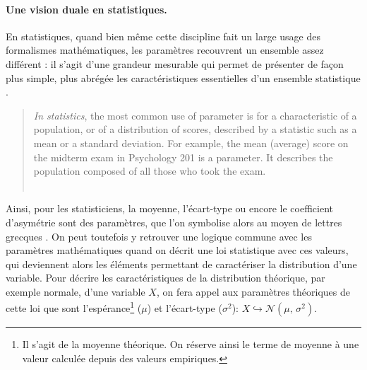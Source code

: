 \paragraph{Une vision duale en statistiques.}

En statistiques, quand bien même cette discipline fait un large usage des formalismes mathématiques, les paramètres recouvrent un ensemble assez différent :
	il s'agit d'une \og grandeur mesurable qui permet de présenter de façon plus simple, plus abrégée les caractéristiques essentielles d'un ensemble statistique\fg{} \autocite[Paramètre, \textsc{stat.} (calcul des probabilités)]{tresor1992}.
\begin{quotation}
	\noindent \og \textit{In statistics}, the most common use of \og parameter\fg{} is for a characteristic of a population, or of a distribution of scores, described by a statistic such as a mean or a standard deviation.
	For example, the mean (average) score on the midterm exam in Psychology 201 is a parameter.
	It describes the population composed of all those who took the exam.\fg{}\\
	\mbox{}~ \hfill \autocite[164]{vogt1993dictionary}
\end{quotation}
Ainsi, pour les statisticiens, la moyenne, l'écart-type ou encore le coefficient d'asymétrie sont des paramètres, que l'on symbolise alors au moyen de lettres grecques \autocite[ibid.]{vogt1993dictionary}.
On peut toutefois y retrouver une logique commune avec les paramètres mathématiques quand on décrit une loi statistique avec ces valeurs, qui deviennent alors les éléments permettant de caractériser la distribution d'une variable.
Pour décrire les caractéristiques de la distribution théorique, par exemple normale, d'une variable $X$, on fera appel aux paramètres théoriques de cette loi que sont l'espérance\footnote{
	Il s'agit de la moyenne théorique.
	On réserve ainsi le terme de moyenne à une valeur calculée depuis des valeurs empiriques.
} ($\mu$) et l'écart-type ($\sigma^{2}$): $X \hookrightarrow \mathcal{N}(\mu,\,\sigma^{2})$.

